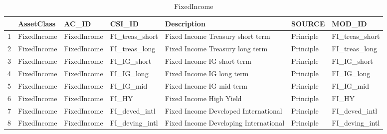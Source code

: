 \begin{longtable}{rllllll}
\caption{FixedIncome} \\ 
  \hline
 & AssetClass & AC\_ID & CSI\_ID & Description & SOURCE & MOD\_ID \\ 
  \hline
1 & FixedIncome & FixedIncome & FI\_treas\_short & Fixed Income Treasury short term & Principle & FI\_treas\_short \\ 
  2 & FixedIncome & FixedIncome & FI\_treas\_long & Fixed Income Treasury long term & Principle & FI\_treas\_long \\ 
  3 & FixedIncome & FixedIncome & FI\_IG\_short & Fixed Income IG short term & Principle & FI\_IG\_short \\ 
  4 & FixedIncome & FixedIncome & FI\_IG\_long & Fixed Income IG long term & Principle & FI\_IG\_long \\ 
  5 & FixedIncome & FixedIncome & FI\_IG\_mid & Fixed Income IG mid term & Principle & FI\_IG\_mid \\ 
  6 & FixedIncome & FixedIncome & FI\_HY & Fixed Income High Yield & Principle & FI\_HY \\ 
  7 & FixedIncome & FixedIncome & FI\_deved\_intl & Fixed Income Developed International & Principle & FI\_deved\_intl \\ 
  8 & FixedIncome & FixedIncome & FI\_deving\_intl & Fixed Income Developing International & Principle & FI\_deving\_intl \\ 
   \hline
\hline
\end{longtable}
